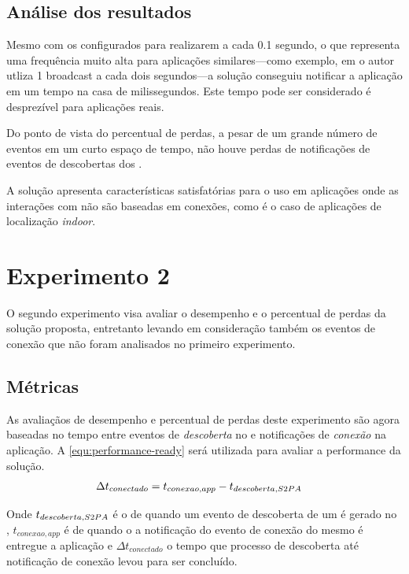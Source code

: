 \subsection{Análise dos resultados}

Mesmo com os \beacons configurados para realizarem \broadcast a cada 0.1 segundo, o que representa uma frequência muito alta para aplicações similares---como exemplo, em  o autor utliza 1 broadcast a cada dois segundos---a solução conseguiu notificar a aplicação em um tempo na casa de milissegundos.  
Este tempo pode ser considerado é desprezível para aplicações reais.

Do ponto de vista do percentual de perdas, a pesar de um grande número de eventos em um curto espaço de tempo, não houve perdas de notificações de eventos de descobertas dos \beacons.

A solução apresenta características satisfatórias para o uso em aplicações onde as interações com \smartobjs não são baseadas em conexões, como é o caso de aplicações de localização \textit{indoor}.

\section{Experimento 2}

O segundo experimento visa avaliar o desempenho e o percentual de perdas da solução proposta, entretanto levando em consideração também os eventos de conexão que não foram analisados no primeiro experimento.

\subsection{Métricas}

As avaliaçãos de desempenho e percentual de perdas deste experimento são agora baseadas no tempo entre eventos de \emph{descoberta} no \stwopa e notificações de \emph{conexão} na aplicação.  
A \autoref{equ:performance-ready} será utilizada para avaliar a performance da solução.
\begin{align}
	\label{equ:performance-ready}
	\Delta t_{conectado} &= t_{conexao,app} - t_{descoberta,S2PA}
\end{align}

Onde $t_{descoberta,S2PA}$ é o \timestamp de quando um evento de descoberta de um \smartobj é gerado no \stwopa, $t_{conexao,app}$ é \timestamp de quando o a notificação do evento de conexão do mesmo \smartobj é entregue a aplicação e $\Delta t_{conectado}$ o tempo que processo de descoberta até notificação de conexão levou para ser concluído.

